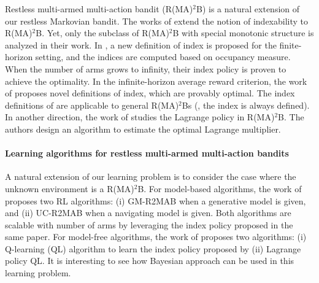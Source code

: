 Restless multi-armed multi-action bandit (R(MA)$^2$B) is a natural extension of our restless Markovian bandit.
The works of \cite{glazebrook2011general,hodge2015asymptotic} extend the notion of indexability to R(MA)$^2$B.
Yet, only the subclass of R(MA)$^2$B with special monotonic structure is analyzed in their work.
In \cite{xiong2021reinforcement}, a new definition of index is proposed for the finite-horizon setting, and the indices are computed based on occupancy measure.
When the number of arms grows to infinity, their index policy is proven to achieve the optimality.
In the infinite-horizon average reward criterion, the work of \cite{xiong2022learning} proposes novel definitions of index, which are provably optimal.
The index definitions of \cite{xiong2021reinforcement, xiong2022learning} are applicable to general R(MA)$^2$Bs (\ie, the index is always defined).
In another direction, the work of \cite{killian2021beyond} studies the Lagrange policy in R(MA)$^2$B.
The authors design an algorithm to estimate the optimal Lagrange multiplier.

%

\paragraph{Learning algorithms for restless multi-armed multi-action bandits}

A natural extension of our learning problem is to consider the case where the unknown environment is a R(MA)$^2$B.
For model-based algorithms, the work of \cite{xiong2022learning} proposes two RL algorithms: (i) GM-R2MAB when a generative model is given, and (ii) UC-R2MAB when a navigating model is given.
Both algorithms are scalable with number of arms by leveraging the index policy proposed in the same paper.
For model-free algorithms, the work of \cite{killian2021q} proposes two algorithms: (i) Q-learning (QL) algorithm to learn the index policy proposed by \cite{glazebrook2011general} (ii) Lagrange policy QL.
It is interesting to see how Bayesian approach can be used in this learning problem.



\endgroup
